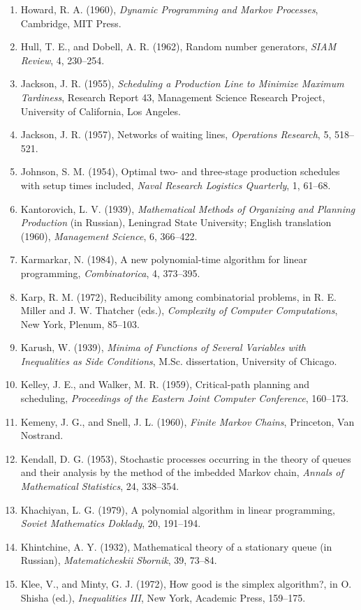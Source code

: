 \documentclass[11pt,a4paper]{article}
\numberwithin{equation}{section}
\theoremstyle{definition}
\begin{document}
\begin{enumerate}
\item Howard, R. A. (1960), \emph{Dynamic Programming and Markov Processes}, Cambridge, MIT Press.
\item Hull, T. E., and Dobell, A. R. (1962), Random number generators, \emph{SIAM Review}, 4, 230--254.
\item Jackson, J. R. (1955), \emph{Scheduling a Production Line to Minimize Maximum Tardiness}, Research Report 43, Management Science Research Project, University of California, Los Angeles.
\item Jackson, J. R. (1957), Networks of waiting lines, \emph{Operations Research}, 5, 518--521.
\item Johnson, S. M. (1954), Optimal two- and three-stage production schedules with setup times included, \emph{Naval Research Logistics Quarterly}, 1, 61--68.
\item Kantorovich, L. V. (1939), \emph{Mathematical Methods of Organizing and Planning Production} (in Russian), Leningrad State University; English translation (1960), \emph{Management Science}, 6, 366--422.
\item Karmarkar, N. (1984), A new polynomial-time algorithm for linear programming, \emph{Combinatorica}, 4, 373--395.
\item Karp, R. M. (1972), Reducibility among combinatorial problems, in R. E. Miller and J. W. Thatcher (eds.), \emph{Complexity of Computer Computations}, New York, Plenum, 85--103.
\item Karush, W. (1939), \emph{Minima of Functions of Several Variables with Inequalities as Side Conditions}, M.Sc. dissertation, University of Chicago.
\item Kelley, J. E., and Walker, M. R. (1959), Critical-path planning and scheduling, \emph{Proceedings of the Eastern Joint Computer Conference}, 160--173.
\item Kemeny, J. G., and Snell, J. L. (1960), \emph{Finite Markov Chains}, Princeton, Van Nostrand.
\item Kendall, D. G. (1953), Stochastic processes occurring in the theory of queues and their analysis by the method of the imbedded Markov chain, \emph{Annals of Mathematical Statistics}, 24, 338--354.
\item Khachiyan, L. G. (1979), A polynomial algorithm in linear programming, \emph{Soviet Mathematics Doklady}, 20, 191--194.
\item Khintchine, A. Y. (1932), Mathematical theory of a stationary queue (in Russian), \emph{Matematicheskii Sbornik}, 39, 73--84.
\item Klee, V., and Minty, G. J. (1972), How good is the simplex algorithm?, in O. Shisha (ed.), \emph{Inequalities III}, New York, Academic Press, 159--175.

\end{enumerate}
\end{document}

